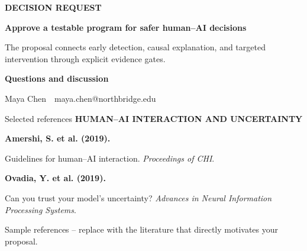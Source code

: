 \documentclass[aspectratio=169,11pt]{beamer}
\makeatletter
\newcommand{\CandidateName}{Maya Chen}
\newcommand{\CandidateEmail}{maya.chen@northbridge.edu}
\newcommand{\eyebrow}[1]{%
  {\color{Ocean}\fontsize{13}{15}\selectfont\bfseries\MakeUppercase{#1}}\par\vspace{0.14cm}%
}
\makeatother
\begin{document}
{
 \begin{frame}[plain]
   \vfill
   \hspace{0.42cm}\begin{minipage}{0.84\textwidth}
     \RaggedRight
     {\color{Gold}\fontsize{14}{16}\selectfont\bfseries DECISION REQUEST}\par\vspace{0.30cm}
     {\color{White}\fontsize{38}{43}\selectfont\bfseries
      Approve a testable program for safer human--AI decisions}\par\vspace{0.38cm}
     {\color{Mist}\fontsize{18}{22}\selectfont
      The proposal connects early detection, causal explanation, and targeted intervention
      through explicit evidence gates.}\par\vspace{0.62cm}
     {\color{White}\fontsize{17}{20}\selectfont\bfseries Questions and discussion}\par
     {\color{Mist}\fontsize{14}{17}\selectfont \CandidateName\ \textbullet\ \CandidateEmail}
   \end{minipage}
   \vfill
 \end{frame}}

\appendix

\begin{frame}{Selected references}
  \eyebrow{Human--AI interaction and uncertainty}
  {\fontsize{16}{21}\selectfont
   \textbf{Amershi, S. et al. (2019).}\par
   Guidelines for human--AI interaction. \emph{Proceedings of CHI}.\par

   \vspace{0.54cm}
   \textbf{Ovadia, Y. et al. (2019).}\par
   Can you trust your model's uncertainty? \emph{Advances in Neural Information Processing Systems}.}

  \vspace{0.62cm}
  {\color{Slate}\fontsize{14}{17}\selectfont
   Sample references -- replace with the literature that directly motivates your proposal.}
\end{frame}
\end{document}
